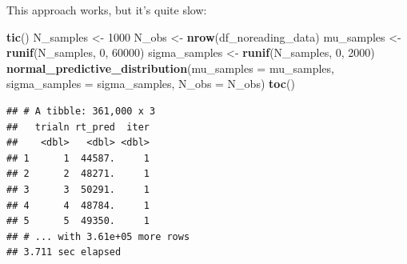 \documentclass[12pt,ignorenonframetext,aspectratio=169]{beamer}
\newenvironment{Shaded}{\begin{snugshade}}{\end{snugshade}}
\newcommand{\DataTypeTok}[1]{\textcolor[rgb]{0.13,0.29,0.53}{#1}}
\newcommand{\DecValTok}[1]{\textcolor[rgb]{0.00,0.00,0.81}{#1}}
\newcommand{\KeywordTok}[1]{\textcolor[rgb]{0.13,0.29,0.53}{\textbf{#1}}}
\newcommand{\NormalTok}[1]{#1}
\newcommand{\StringTok}[1]{\textcolor[rgb]{0.31,0.60,0.02}{#1}}
\begin{document}
\begin{frame}[fragile]

This approach works, but it's quite slow:

\scriptsize

\begin{Shaded}
\begin{Highlighting}[]
\KeywordTok{tic}\NormalTok{()}
\NormalTok{N_samples <-}\StringTok{ }\DecValTok{1000}
\NormalTok{N_obs <-}\StringTok{ }\KeywordTok{nrow}\NormalTok{(df_noreading_data)}
\NormalTok{mu_samples <-}\StringTok{ }\KeywordTok{runif}\NormalTok{(N_samples, }\DecValTok{0}\NormalTok{, }\DecValTok{60000}\NormalTok{)}
\NormalTok{sigma_samples <-}\StringTok{ }\KeywordTok{runif}\NormalTok{(N_samples, }\DecValTok{0}\NormalTok{, }\DecValTok{2000}\NormalTok{)}
\KeywordTok{normal_predictive_distribution}\NormalTok{(}\DataTypeTok{mu_samples =}\NormalTok{ mu_samples,}
                               \DataTypeTok{sigma_samples =}\NormalTok{ sigma_samples,}
                                \DataTypeTok{N_obs =}\NormalTok{ N_obs)}
\KeywordTok{toc}\NormalTok{()}
\end{Highlighting}
\end{Shaded}

\begin{verbatim}
## # A tibble: 361,000 x 3
##   trialn rt_pred  iter
##    <dbl>   <dbl> <dbl>
## 1      1  44587.     1
## 2      2  48271.     1
## 3      3  50291.     1
## 4      4  48784.     1
## 5      5  49350.     1
## # ... with 3.61e+05 more rows
## 3.711 sec elapsed
\end{verbatim}

\normalsize

\end{frame}
\end{document}
